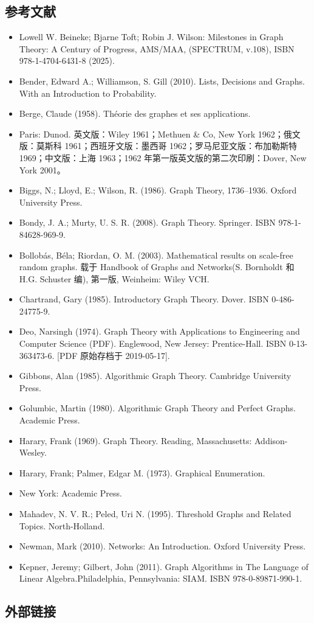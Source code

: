 \subsection{参考文献}
\begin{itemize}
\item Lowell W. Beineke; Bjarne Toft; Robin J. Wilson: Milestones in Graph Theory: A Century of Progress, AMS/MAA, (SPECTRUM, v.108), ISBN 978-1-4704-6431-8 (2025).
\item Bender, Edward A.; Williamson, S. Gill (2010). Lists, Decisions and Graphs. With an Introduction to Probability.
\item Berge, Claude (1958). Théorie des graphes et ses applications.\item Paris: Dunod. 英文版：Wiley 1961；Methuen & Co, New York 1962；俄文版：莫斯科 1961；西班牙文版：墨西哥 1962；罗马尼亚文版：布加勒斯特 1969；中文版：上海 1963；1962 年第一版英文版的第二次印刷：Dover, New York 2001。
\item Biggs, N.; Lloyd, E.; Wilson, R. (1986). Graph Theory, 1736–1936. Oxford University Press.
\item Bondy, J. A.; Murty, U. S. R. (2008). Graph Theory. Springer. ISBN 978-1-84628-969-9.
\item Bollobás, Béla; Riordan, O. M. (2003). Mathematical results on scale-free random graphs. 载于 Handbook of Graphs and Networks(S. Bornholdt 和 H.G. Schuster 编), 第一版, Weinheim: Wiley VCH.
\item Chartrand, Gary (1985). Introductory Graph Theory. Dover. ISBN 0-486-24775-9.
\item Deo, Narsingh (1974). Graph Theory with Applications to Engineering and Computer Science (PDF). Englewood, New Jersey: Prentice-Hall. ISBN 0-13-363473-6. [PDF 原始存档于 2019-05-17].
\item Gibbons, Alan (1985). Algorithmic Graph Theory. Cambridge University Press.
\item Golumbic, Martin (1980). Algorithmic Graph Theory and Perfect Graphs. Academic Press.
\item Harary, Frank (1969). Graph Theory. Reading, Massachusetts: Addison-Wesley.
\item Harary, Frank; Palmer, Edgar M. (1973). Graphical Enumeration.\item New York: Academic Press.
\item Mahadev, N. V. R.; Peled, Uri N. (1995). Threshold Graphs and Related Topics. North-Holland.
\item Newman, Mark (2010). Networks: An Introduction. Oxford University Press.
\item Kepner, Jeremy; Gilbert, John (2011). Graph Algorithms in The Language of Linear Algebra.Philadelphia, Pennsylvania: SIAM. ISBN 978-0-89871-990-1.
\end{itemize}
\subsection{外部链接}